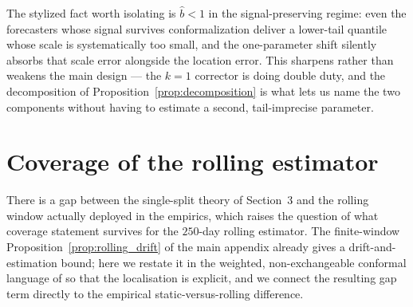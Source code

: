 \documentclass[11pt]{article}
\newcommand{\1}{\boldsymbol{1}}
\begin{document}
The stylized fact worth isolating is $\hat b<1$ in the signal-preserving regime:
even the forecasters whose signal survives conformalization deliver a lower-tail
quantile whose scale is systematically too small, and the one-parameter shift
silently absorbs that scale error alongside the location error. This sharpens
rather than weakens the main design --- the $k=1$ corrector is doing double
duty, and the decomposition of Proposition~\ref{prop:decomposition} is what lets
us name the two components without having to estimate a second, tail-imprecise
parameter.

\section{Coverage of the rolling estimator}
\label{sec:rr_rolling}

There is a gap between the single-split theory of Section~3 and the
rolling window actually deployed in the empirics, which raises the question of
what coverage statement survives for the $250$-day rolling estimator. The finite-window
Proposition~\ref{prop:rolling_drift} of the main appendix already gives a
drift-and-estimation bound; here we restate it in the weighted, non-exchangeable
conformal language of \citet{barber2023conformal} so that the localisation is
explicit, and we connect the resulting gap term directly to the empirical
static-versus-rolling difference.
\end{document}
